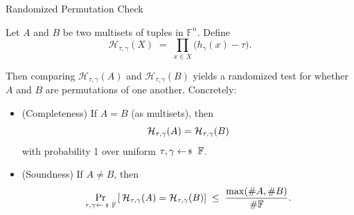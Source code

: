 \documentclass{zkdl-presentation-template}
\begin{document}
    \begin{frame}{Randomized Permutation Check}
        \begin{definition}
            Let $A$ and $B$ be two multisets of tuples in $\mathbb{F}^n$. Define
            \begin{equation*}
                \mathcal{H}_{\tau,\gamma}(X)\;=\;\prod_{x \in X}\bigl(h_{\gamma}(x)-\tau\bigr).
            \end{equation*}

            Then comparing $\mathcal{H}_{\tau,\gamma}(A)$ and $\mathcal{H}_{\tau,\gamma}(B)$ yields a
            randomized test for whether $A$ and $B$ are permutations of one another. Concretely:
            \pause
            \begin{itemize}
                \item (Completeness) If $A=B$ (as multisets), then
                    \vspace{-5px}
                    \begin{equation*}
                        \mathcal{H}_{\tau,\gamma}(A)=\mathcal{H}_{\tau,\gamma}(B)
                        \vspace{-5px}
                    \end{equation*}
                    with probability 1 over uniform $\tau,\gamma \leftarrowS \mathbb{F}$.\pause
                \item (Soundness) If $A\neq B$, then
                    \vspace{-5px}
                    \begin{equation*}
                        \Pr_{\tau,\gamma \leftarrowS \mathbb{F}}\left[\,\mathcal{H}_{\tau,\gamma}(A)=\mathcal{H}_{\tau,\gamma}(B)\right]\;\le\; \frac{\max(\#A,\#B)}{\#\mathbb{F}}.
                    \end{equation*}
            \end{itemize}
        \end{definition}
    \end{frame}
\end{document}

